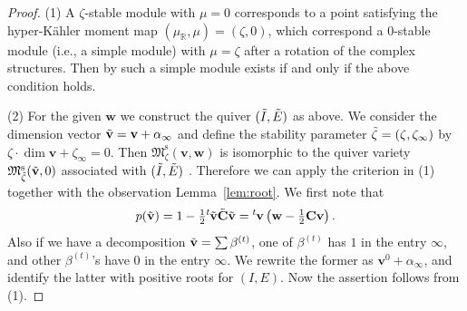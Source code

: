 \documentclass[10pt,a4paper]{amsart}
\theoremstyle{definition}
\numberwithin{equation}{section}
\newcommand{\lemref}[1]{Lemma~\ref{#1}}
\newcommand{\lsp}[2]{{\mskip-.3mu}{}^{#1}\mskip-1mu{#2}}
\newcommand{\R}{{\mathbb R}}
\newcommand{\M}{{\mathfrak M}} %
\newcommand{\Mreg}{\M^{\operatorname{s}}}
\newcommand{\bv}{{\mathbf v}} %
\newcommand{\bw}{{\mathbf w}} %
\newcommand{\bC}{{\mathbf C}} %
\begin{document}
\begin{proof}
(1) A $\zeta$-stable module with $\mu = 0$ corresponds to a point
satisfying the hyper-K\"ahler moment map $(\mu_\R,\mu) = (\zeta,0)$,
which correspond a $0$-stable module (i.e., a simple module) with $\mu
= \zeta$ after a rotation of the complex structures. Then by
\cite[Theorem~1.2]{CB} such a simple module exists if and only if the
above condition holds.

(2) For the given $\bw$ we construct the quiver $(\Tilde{I},\Tilde{E})$ as
above. We consider the dimension vector $\Tilde{\bv} = \bv + \alpha_\infty$
and def\/ine the stability parameter $\Tilde{\zeta} = (\zeta,\zeta_\infty)$ by
\(
\zeta\cdot \dim \bv + \zeta_\infty = 0.
\)
Then $\Mreg_\zeta(\bv,\bw)$ is isomorphic to the quiver variety
$\Mreg_{\Tilde{\zeta}}(\Tilde{\bv},0)$ associated with
$(\Tilde{I},\Tilde{E})$ \cite[the end of Introduction]{CB}.
%
Therefore we can apply the criterion in (1) together with the
observation \lemref{lem:root}. We f\/irst note that
\[
  p(\Tilde{\bv}) = 1 - \tfrac12 \lsp{t}{\Tilde{\bv}} \Tilde{\bC} \Tilde{\bv}
  = \lsp{t}{\bv}\left(\bw - \tfrac12 \bC \bv\right).
\]
Also if we have a decomposition $\Tilde{\bv} = \sum \beta^{(t)}$, one
of $\beta^{(t)}$ has $1$ in the entry $\infty$, and other
$\beta^{(t)}$'s have $0$ in the entry $\infty$. We rewrite the former
as $\bv^0 + \alpha_\infty$, and identify the latter with positive
roots for $(I,E)$. Now the assertion follows from (1).
\end{proof}
\end{document}
